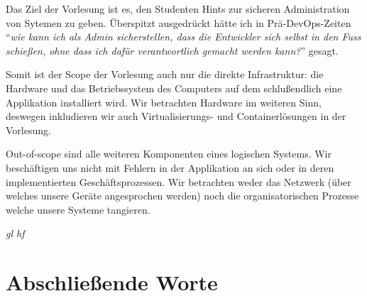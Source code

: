 \documentclass[11pt,fleqn,openany]{book} %
\begin{document}



\pagestyle{empty} %

\tableofcontents %


\pagestyle{fancy} %

\mainmatter

Das Ziel der Vorlesung ist es, den Studenten Hints zur sicheren Administration von Sytemen zu geben. Überspitzt ausgedrückt hätte ich in Prä-DevOps-Zeiten ``\textit{wie kann ich als Admin sicherstellen, dass die Entwickler sich selbst in den Fuss schießen, ohne dass ich dafür verantwortlich gemacht werden kann?}'' gesagt.

Somit ist der Scope der Vorlesung auch nur die direkte Infrastruktur: die Hardware und das Betriebssystem des Computers auf dem schlußendlich eine Applikation installiert wird. Wir betrachten Hardware im weiteren Sinn, deswegen inkludieren wir auch Virtualisierungs- und Containerlösungen in der Vorlesung.

Out-of-scope sind alle weiteren Komponenten eines logischen Systems. Wir beschäftigen uns nicht mit Fehlern in der Applikation an sich oder in deren implementierten Geschäftsprozessen. Wir betrachten weder das Netzwerk (über welches unsere Geräte angesprochen werden) noch die organisatorischen Prozesse welche unsere Systeme tangieren.

\textit{gl hf}









\part{Abschließende Worte}
\end{document}
